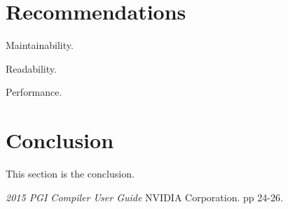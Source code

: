 \documentclass[11pt, oneside]{article}   %
\begin{document}
\section{Recommendations}

Maintainability.

Readability.

Performance.

\section{Conclusion}
This section is the conclusion.

\begin{thebibliography}{100}

 {\em 2015 PGI Compiler User Guide} NVIDIA Corporation. pp 24-26.

\end{thebibliography}
\end{document}
